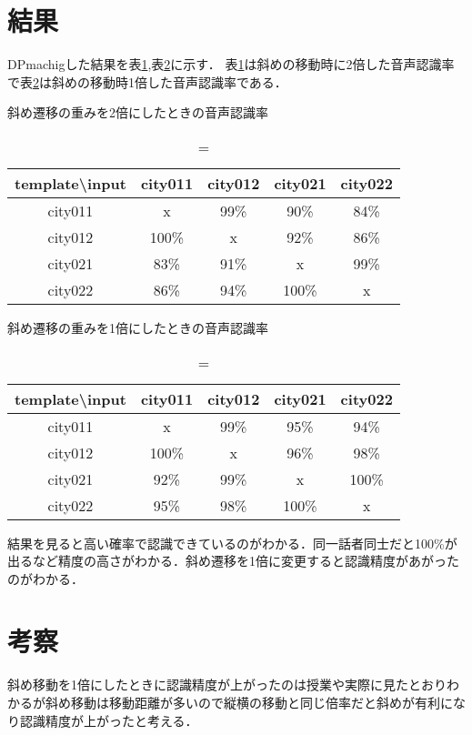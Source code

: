 \documentclass[dvipdfmx]{jsarticle}
\begin{document}
\section{結果}
DPmachigした結果を表\ref{dp},表\ref{dd}に示す．
表\ref{dp}は斜めの移動時に2倍した音声認識率で表\ref{dd}は斜めの移動時1倍した音声認識率である．
\begin{table}[H]
\caption=斜め遷移の重みを2倍にしたときの音声認識率
\label{dp}
\begin{tabular}{|c|c|c|c|c|}
\hline
template\textbackslash{}input & city011 & city012 & city021 & city022 \\ \hline
city011                       & x       & 99\%    & 90\%    & 84\%    \\ \hline
city012                       & 100\%   & x       & 92\%    & 86\%    \\ \hline
city021                       & 83\%    & 91\%    & x       & 99\%    \\ \hline
city022                       & 86\%    & 94\%    & 100\%   & x       \\ \hline
\end{tabular}
\end{table}
\begin{table}[H]
\caption=斜め遷移の重みを1倍にしたときの音声認識率
\label{dd}
\begin{tabular}{|c|c|c|c|c|}
\hline
template\textbackslash{}input & city011 & city012 & city021 & city022 \\ \hline
city011                       & x       & 99\%    & 95\%    & 94\%    \\ \hline
city012                       & 100\%   & x       & 96\%    & 98\%    \\ \hline
city021                       & 92\%    & 99\%    & x       & 100\%   \\ \hline
city022                       & 95\%    & 98\%    & 100\%   & x       \\ \hline
\end{tabular}
\end{table}
結果を見ると高い確率で認識できているのがわかる．同一話者同士だと100\%が出るなど精度の高さがわかる．斜め遷移を1倍に変更すると認識精度があがったのがわかる．

\section{考察}
斜め移動を1倍にしたときに認識精度が上がったのは授業や実際に見たとおりわかるが斜め移動は移動距離が多いので縦横の移動と同じ倍率だと斜めが有利になり認識精度が上がったと考える．
\end{document}
